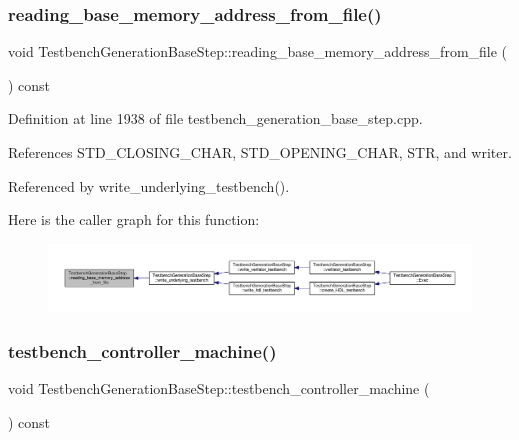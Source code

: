 \subsubsection{\texorpdfstring{reading\+\_\+base\+\_\+memory\+\_\+address\+\_\+from\+\_\+file()}{reading\_base\_memory\_address\_from\_file()}}
{\footnotesize\ttfamily void Testbench\+Generation\+Base\+Step\+::reading\+\_\+base\+\_\+memory\+\_\+address\+\_\+from\+\_\+file (\begin{DoxyParamCaption}{ }\end{DoxyParamCaption}) const\hspace{0.3cm}{\ttfamily [protected]}}



Definition at line 1938 of file testbench\+\_\+generation\+\_\+base\+\_\+step.\+cpp.



References S\+T\+D\+\_\+\+C\+L\+O\+S\+I\+N\+G\+\_\+\+C\+H\+AR, S\+T\+D\+\_\+\+O\+P\+E\+N\+I\+N\+G\+\_\+\+C\+H\+AR, S\+TR, and writer.



Referenced by write\+\_\+underlying\+\_\+testbench().

Here is the caller graph for this function\+:
\nopagebreak
\begin{figure}[H]
\begin{center}
\leavevmode
\includegraphics[width=350pt]{dc/d02/classTestbenchGenerationBaseStep_a91b50173691b97e21e807b6b65aed466_icgraph}
\end{center}
\end{figure}
\mbox{\label{classTestbenchGenerationBaseStep_ababf761d897357b1854543acc24547ae}} 
\subsubsection{\texorpdfstring{testbench\+\_\+controller\+\_\+machine()}{testbench\_controller\_machine()}}
{\footnotesize\ttfamily void Testbench\+Generation\+Base\+Step\+::testbench\+\_\+controller\+\_\+machine (\begin{DoxyParamCaption}{ }\end{DoxyParamCaption}) const\hspace{0.3cm}{\ttfamily [protected]}}



